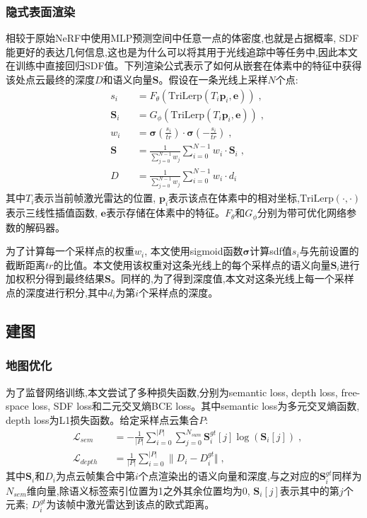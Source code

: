 \subsubsection{隐式表面渲染}
相较于原始NeRF中使用MLP预测空间中任意一点的体密度,也就是占据概率, SDF能更好的表达几何信息,这也是为什么可以将其用于光线追踪中等任务中,因此本文在训练中直接回归SDF值。下列渲染公式表示了如何从嵌套在体素中的特征中获得该处点云最终的深度$D$和语义向量$\mathbf{S}$。假设在一条光线上采样$N$个点:
\begin{equation}
\begin{alignedat}{2}
    &s_i&&=F_\theta(\mbox{TriLerp}(T_i\mathbf{p}_i,\mathbf{e}))\;,\\
    &\mathbf{S}_i&&=G_\phi(\mbox{TriLerp}(T_i\mathbf{p}_i,\mathbf{e}))\;,\\
    &w_i&&=\mathbf{\sigma}(\frac{s_i}{tr})\cdot\mathbf{\sigma}(-\frac{s_i}{tr})\;,\\
    &\mathbf{S} &&= \frac{1}{\sum_{j=0}^{N-1}w_j}\sum_{i=0}^{N-1}w_i\cdot\mathbf{S}_i\;,\\
    &D &&= \frac{1}{\sum_{j=0}^{N-1}w_j}\sum_{i=0}^{N-1}w_i\cdot d_i
\end{alignedat}
\end{equation}
其中$T_i$表示当前帧激光雷达的位置, $\mathbf{p}_i$表示该点在体素中的相对坐标,$\mbox{TriLerp}(\cdot , \cdot)$表示三线性插值函数, $\mathbf{e}$表示存储在体素中的特征。$F_\theta\mbox{和}G_\phi$分别为带可优化网络参数的解码器。

为了计算每一个采样点的权重$w_i$, 本文使用sigmoid函数$\mathbf{\sigma}$计算sdf值$s_i$与先前设置的截断距离$tr$的比值\cite{nrgbd}。本文使用该权重对这条光线上的每个采样点的语义向量$\mathbf{S}_i$进行加权积分得到最终结果$\mathbf{S}$。同样的,为了得到深度值,本文对这条光线上每一个采样点的深度进行积分,其中$d_i$为第$i$个采样点的深度。
\subsection{建图}
\subsubsection{地图优化}
为了监督网络训练,本文尝试了多种损失函数,分别为semantic loss, depth loss, free-space loss, SDF loss和二元交叉熵BCE loss。其中semantic loss为多元交叉熵函数, depth loss为L1损失函数。给定采样点云集合$P$:
\begin{equation}
\begin{alignedat}{2}
    &\mathcal{L}_{sem} &&= -\frac{1}{|P|}\sum_{i=0}^{|P|}\sum_{j=0}^{N_{sum}}\mathbf{S}_i^{gt}[j]\log(\mathbf{S}_i[j])\;,\\
    &\mathcal{L}_{depth} &&= \frac{1}{|P|}\sum_{i=0}^{|P|}\| D_i-D_i^{gt}\Vert\;,
\end{alignedat}
\end{equation}
其中$\mathbf{S}_i$和$D_i$为点云帧集合中第$i$个点渲染出的语义向量和深度,与之对应的$\mathbf{S}_i^{gt}$同样为$N_{sem}$维向量,除语义标签索引位置为1之外其余位置均为0, $\mathbf{S}_i[j]$表示其中的第$j$个元素; $D_i^{gt}$为该帧中激光雷达到该点的欧式距离。 

